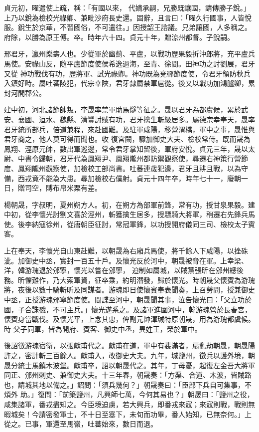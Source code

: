 \begin{pinyinscope}
 貞元初，曜遣使上疏，稱：「有國以來，
 代嫡承嗣，兄勝既讓國，請傳勝子銳。」上乃以銳為檢校光祿卿、兼毗沙府長史還。固辭，且言曰：「曜久行國事，人皆悅服。銳生於京華，不習國俗，不可遣往。」因授韶王諮議。兄弟讓國，人多稱之。府除，以勝為原王傅。卒。時年六十四。貞元十年，贈涼州都督。子銳嗣。



 邢君牙，瀛州樂壽人也。少從軍於幽薊、平盧，以戰功歷果毅折沖郎將，充平盧兵馬使。安祿山反，隨平盧節度使侯希逸過海，至青、徐間。田神功之討劉展，君牙又從
 神功戰伐有功，歷將軍、試光祿卿。神功既為兗鄆節度使，令君牙領防秋兵入鎮好畤。屬吐蕃陵犯，代宗幸陜，君牙隸屬禁軍扈從。後又以戰功加鴻臚卿，累封河間郡公。



 建中初，河北諸節帥叛，李晟率禁軍助馬燧等征之。晟以君牙為都虞候，累於武安、襄國、洹水、魏縣、清豐討賊有功，君牙擒生斬級居多。屬德宗幸奉天，晟率君牙統所部兵，倍道兼程，來赴國難。及駐軍咸陽，移營渭橋，軍中之事，晟惟與君牙商之，他人莫可得而聞也。收
 復宮闕，驟加御史大夫、檢校常侍。既而晟為鳳翔、涇原元帥，數出軍巡邊，常令君牙掌知留後，軍府安悅。貞元三年，晟以太尉、中書令歸朝，君牙代為鳳翔尹、鳳翔隴州都防禦觀察使，尋遷右神策行營節度、鳳翔隴州觀察使，加檢校工部尚書。吐蕃連歲犯邊，君牙且耕且戰，以為守備，西戎竟不能為大患。尋加檢校右僕射。貞元十四年卒，時年七十一，廢朝一日，贈司空，賻布帛米粟有差。



 楊朝晟，字叔明，夏州朔方人。初，在朔方為部軍前鋒，常有功，授甘泉果毅。建中初，從李懷光討劉文喜於涇州，斬獲擒生居多，授驃騎大將軍，稍遷右先鋒兵馬使。後李納寇徐州，從唐朝臣征討，常冠軍鋒，以功授開府儀同三司、檢校太子賓客。



 上在奉天，李懷光自山東赴難，以朝晟為右廂兵馬使，將千餘人下咸陽，以挫硃泚。加御史中丞，實封一百五十戶。及懷光反於河中，朝晟被脅在軍。上幸梁、洋，韓游瑰退於邠寧，懷光以嘗在邠寧，
 迫制如屬城，以賊黨張昕在邠州總後務。昕懼難作，乃大索軍資，征卒乘，約明潛發，歸於懷光。時朝晟父懷賓為游瑰將，夜後以數十騎斬昕及同謀者。游瑰即日使懷賓奉表聞奏，上召勞問，授兼御史中丞，正授游瑰邠寧節度使。間諜至河中，朝晟聞其事，泣告懷光曰：「父立功於國，子合誅戮，不可主兵。」懷光遂系之。及諸軍進圍河中，韓游瑰營於長春宮，懷賓身當戰伐。及懷光平，上念其忠，俾副元帥渾瑊特原朝晟，用為游瑰都虞候。時
 父子同軍，皆為開府、賓客、御史中丞，異姓王，榮於軍中。



 後詔徵游瑰宿衛，以張獻甫代之。獻甫在道，軍中有裴滿者，扇亂劫朝晟，朝晟陽許之，密計斬三百餘人。獻甫入，改御史大夫。九年，城鹽州，徵兵以護外境，朝晟分統士馬鎮木波堡。獻甫卒，詔以朝晟代之。其年，丁母憂，起復左金吾大將軍同正、邠州刺史、兼御史大夫。十三年春，朝晟奏：「方渠、合道、木波，皆賊路也，請城其地以備之。」詔問：「須兵幾何？」朝晟奏曰：「臣部下兵自可集事，不煩外
 助。」復問：「前築鹽州，凡興師七萬，今何其易也？」朝晟曰：「鹽州之役，咸集諸軍，番戎盡知之。今臣境迫虜，若大興兵，即番戎來寇；來寇則戰，戰則無暇城矣！今請密發軍士，不十日至塞下，未旬而功畢，番人始知，已無奈何。」上從之。已事，軍還至馬嶺，吐蕃始來，數日而退。




\end{pinyinscope}
